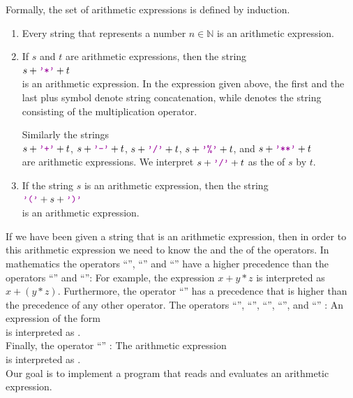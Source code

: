 Formally, the set of arithmetic expressions is defined by induction.
\begin{enumerate}
\item Every string that represents a number $n \in \mathbb{N}$ is an arithmetic expression.
\item If $s$ and $t$ are arithmetic expressions, then the string
      \\[0.2cm]
      \hspace*{1.3cm}
      $s+\mytt{'*'}+t$
      \\[0.2cm]
      is an arithmetic expression.  In the expression given above, the first and the last plus symbol
      denote string concatenation, while  denotes the string consisting of the multiplication
      operator. 

      Similarly the strings  
      \\[0.2cm]
      \hspace*{1.3cm}
      $s + \mytt{'+'} + t$, \quad $s + \mytt{'-'} + t$, \quad
      $s + \mytt{'/'} + t$, \quad $s + \mytt{'\symbol{37}'} + t$, \quad and \quad $s +\mytt{'**'} + t$
      \\[0.2cm]
      are arithmetic expressions.  We interpret  $s + \mytt{'/'} + t$ as the  of $s$
      by $t$.
\item If the string $s$ is an arithmetic expression, then the string
      \\[0.2cm]
      \hspace*{1.3cm}
      $\mytt{'('}+ s + \mytt{')'}$ 
      \\[0.2cm]
      is an arithmetic expression.
\end{enumerate}
If we have been given a string that is an arithmetic expression, then in order to  this
arithmetic expression we need to know the  and the
 of the operators.
In mathematics the operators ``\mytt{*}'', ``\mytt{/}'' and ``'' have a
higher precedence than the operators ``\mytt{+}'' and ``\mytt{-}'':  For example, the expression
$x+y*z$ is interpreted as $x + (y * z)$.
 Furthermore, the operator
  ``\mytt{**}'' has a precedence that is higher than the precedence
 of any other operator.  The operators
``\mytt{+}'', ``\mytt{-}'', ``\mytt{*}'', ``\mytt{/}'', and ``''
:  An expression of the form 
\\[0.2cm]
\hspace*{1.3cm} 
 \quad is interpreted as \quad {}.
 \\[0.2cm]
Finally, the operator ``\mytt{**}'' :
The arithmetic expression \\[0.2cm]
\hspace*{1.3cm} 
 \quad is interpreted as \quad 
{}. 
\\[0.2cm]
Our goal is to implement a program that reads and evaluates an arithmetic expression.


